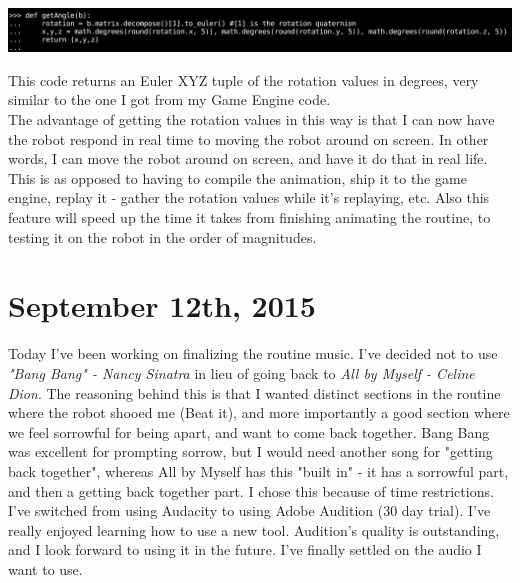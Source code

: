     		\centerline{\includegraphics[width=\linewidth]{images/matrix_rotation_extractor}}
    		\vspace{10pt}
    		
    		This code returns an Euler XYZ tuple of the rotation values in degrees, very similar to the one I got from my Game Engine code.\\
    		
    		The advantage of getting the rotation values in this way is that I can now have the robot respond in real time to moving the robot around on screen. In other words, I can move the robot around on screen, and have it do that in real life. This is as opposed to having to compile the animation, ship it to the game engine, replay it - gather the rotation values while it's replaying, etc. Also this feature will speed up the time it takes from finishing animating the routine, to testing it on the robot in the order of magnitudes.\\
    		
    	\section{September 12th, 2015}
    		Today I've been working on finalizing the routine music. I've decided not to use \textit{"Bang Bang" - Nancy Sinatra} in lieu of going back to \textit{All by Myself - Celine Dion}. The reasoning behind this is that I wanted distinct sections in the routine where the robot shooed me (Beat it), and more importantly a good section where we feel sorrowful for being apart, and want to come back together. Bang Bang was excellent for prompting sorrow, but I would need another song for "getting back together", whereas All by Myself has this "built in" - it has a sorrowful part, and then a getting back together part. I chose this because of time restrictions.\\            
    		
    		I've switched from using Audacity to using Adobe Audition (30 day trial). I've really enjoyed learning how to use a new tool. Audition's quality is outstanding, and I look forward to using it in the future. I've finally settled on the audio I want to use.\\
    		
